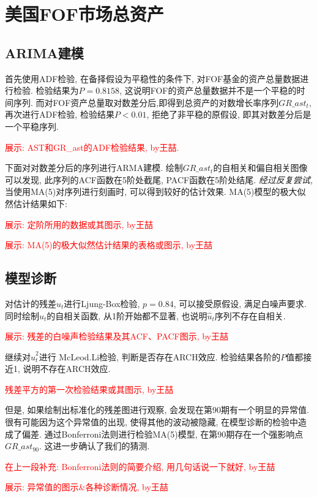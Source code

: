 \section{美国FOF市场总资产}
\subsection{ARIMA建模}
首先使用ADF检验, 在备择假设为平稳性的条件下, 对FOF基金的资产总量数据进行检验. 检验结果为$P=0.8158$, 这说明FOF的资产总量数据并不是一个平稳的时间序列. 而对FOF资产总量取对数差分后,即得到总资产的对数增长率序列${GR\_ast_t}$, 再次进行ADF检验, 检验结果$P<0.01$, 拒绝了非平稳的原假设, 即其对数差分后是一个平稳序列.

\textcolor{red}{展示: AST和GR\_ast的ADF检验结果, by王喆. }

下面对对数差分后的序列进行ARMA建模. 绘制$GR\_ast_t$的自相关和偏自相关图像可以发现, 此序列的ACF函数在5阶处截尾, PACF函数在5阶处结尾. \emph{经过反复尝试,} 当使用MA(5)对序列进行刻画时, 可以得到较好的估计效果. MA(5)模型的极大似然估计结果如下:

\textcolor{red}{展示: 定阶所用的数据或其图示, by王喆}

\textcolor{red}{展示: MA(5)的极大似然估计结果的表格或图示, by王喆}

\subsection{模型诊断}

对估计的残差$\hat{u}_t$进行Ljung-Box检验, $p=0.84$, 可以接受原假设, 满足白噪声要求. 同时绘制$\hat{u}_t$的自相关函数, 从1阶开始都不显著, 也说明$\hat{u}_t$序列不存在自相关.

\textcolor{red}{展示: 残差的白噪声检验结果及其ACF、PACF图示, by王喆}

继续对$\hat{u}_t^2$进行 McLeod.Li检验, 判断是否存在ARCH效应. 检验结果各阶的$P$值都接近1, 说明不存在ARCH效应.

\textcolor{red}{残差平方的第一次检验结果或其图示, by王喆}

但是, 如果绘制出标准化的残差图进行观察, 会发现在第90期有一个明显的异常值. 很有可能因为这个异常值的出现, 使得其他的波动被隐藏, 在模型诊断的检验中造成了偏差. 通过Bonferroni法则进行检验MA(5)模型, 在第90期存在一个强影响点$GR\_ast_{90}$. 这进一步确认了我们的猜测.

\textcolor{red}{在上一段补充: Bonferroni法则的简要介绍, 用几句话说一下就好, by王喆}

\textcolor{red}{展示: 异常值的图示\&各种诊断情况, by王喆}

